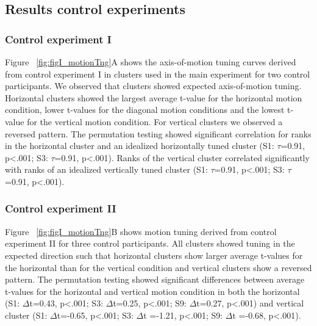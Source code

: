 \subsection{Results control experiments}
\subsubsection{Control experiment I}
Figure ~\ref{fig:figI_motionTng}A shows the axis-of-motion tuning curves derived from control experiment I in clusters used in the main experiment for two control participants. We observed that clusters showed expected axis-of-motion tuning. Horizontal clusters showed the largest average t-value for the horizontal motion condition, lower t-values for the diagonal motion conditions and the lowest t-value for the vertical motion condition. For vertical clusters we observed a reversed pattern. The permutation testing showed significant correlation for ranks in the horizontal cluster and an idealized horizontally tuned cluster (S1: $\tau$=0.91, p\textless.001; S3: $\tau$=0.91, p\textless.001). Ranks of the vertical cluster correlated significantly with ranks of an idealized vertically tuned cluster (S1: $\tau$=0.91, p\textless.001; S3: $\tau$=0.91, p\textless.001).

\subsubsection{Control experiment II}
Figure ~\ref{fig:figI_motionTng}B shows motion tuning derived from control experiment II for three control participants. All clusters showed tuning in the expected direction such that horizontal clusters show larger average t-values for the horizontal than for the vertical condition and vertical clusters show a reversed pattern. The permutation testing showed significant differences between average t-values for the horizontal and vertical motion condition in both the horizontal (S1: $\Delta$t=0.43, p\textless.001; S3: $\Delta$t=0.25, p\textless.001; S9: $\Delta$t=0.27, p\textless.001) and vertical cluster (S1: $\Delta$t=-0.65, p\textless.001; S3: $\Delta$t =-1.21, p\textless.001; S9: $\Delta$t =-0.68, p\textless.001).

